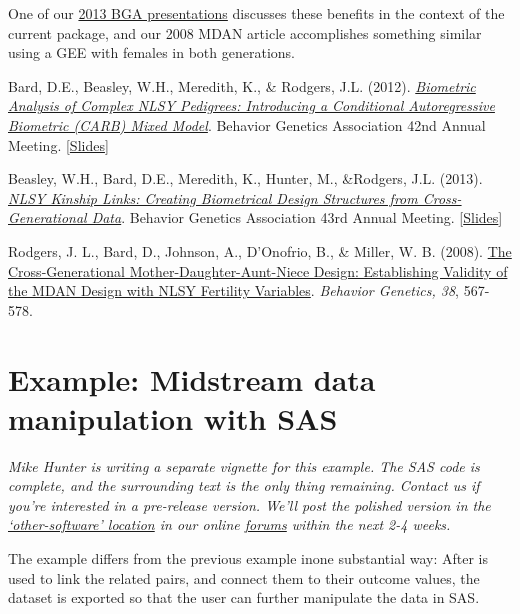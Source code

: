 \documentclass{article}\usepackage[]{graphicx}\usepackage[]{color}
\begin{document}
One of our \href{https://r-forge.r-project.org/forum/forum.php?thread_id=28498&forum_id=4266&group_id=1330}{2013 BGA presentations}  discusses these benefits in the context of the current  package, and our 2008 MDAN article accomplishes something similar using a GEE with females in both generations.

Bard, D.E., Beasley, W.H., Meredith, K., \& Rodgers, J.L. (2012). \href{http://link.springer.com/article/10.1007/s10519-012-9566-6}{\emph{Biometric Analysis of Complex NLSY Pedigrees: Introducing a Conditional Autoregressive Biometric (CARB) Mixed Model}}. Behavior Genetics Association 42nd Annual Meeting. [\href{https://r-forge.r-project.org/forum/forum.php?thread_id=4761&forum_id=4266&group_id=1330}{Slides}]

Beasley, W.H., Bard, D.E., Meredith, K., Hunter, M., \&Rodgers, J.L. (2013). \href{http://link.springer.com/article/10.1007/s10519-013-9623-9}{\emph{NLSY Kinship Links:  Creating Biometrical Design Structures from Cross-Generational Data}}. Behavior Genetics Association 43rd Annual Meeting. [\href{https://r-forge.r-project.org/forum/forum.php?thread_id=28498&forum_id=4266&group_id=1330}{Slides}]

Rodgers, J. L., Bard, D., Johnson, A., D'Onofrio, B., \& Miller, W. B. (2008). \href{http://www.ncbi.nlm.nih.gov/pubmed/18825497}{The Cross-Generational Mother-Daughter-Aunt-Niece Design: Establishing Validity of the MDAN Design with NLSY Fertility Variables}. \emph{Behavior Genetics, 38}, 567-578.



\section{Example: Midstream data manipulation with SAS}
\emph{Mike Hunter is writing a separate vignette for this example.  The SAS code is complete, and the surrounding text is the only thing remaining.  Contact us if you're interested in a pre-release version.  We'll post the polished version in the \href{https://r-forge.r-project.org/forum/forum.php?forum_id=4316&group_id=1330}{`other-software' location} in our online \href{https://r-forge.r-project.org/forum/?group_id=1330}{forums} within the next 2-4 weeks. }

The example differs from the previous example  inone substantial way: After \R{} is used to link the related pairs, and connect them to their outcome values, the dataset is exported so that the user can further manipulate the data in SAS.  
\end{document}
